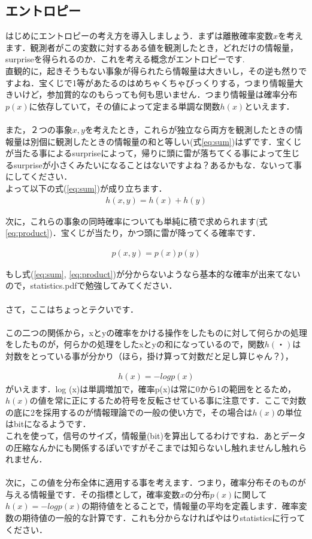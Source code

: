 \documentclass[11pt,a4paper]{jsarticle}                    %
\begin{document}
\subsection{エントロピー}
はじめにエントロピーの考え方を導入しましょう．まずは離散確率変数$x$を考えます．観測者がこの変数に対するある値を観測したとき，どれだけの情報量，surpriseを得られるのか．これを考える概念がエントロピーです.\\
直観的に，起きそうもない事象が得られたら情報量は大きいし，その逆も然りですよね．宝くじで1等があたるのはめちゃくちゃびっくりする，つまり情報量大きいけど，参加賞的なのもらっても何も思いません．つまり情報量は確率分布$p(x)$に依存していて，その値によって定まる単調な関数$h(x)$といえます．\\
\\
また，２つの事象$x, y$を考えたとき，これらが独立なら両方を観測したときの情報量は別個に観測したときの情報量の和と等しい(式\ref{eq:sum})はずです．宝くじが当たる事によるsurpriseによって，帰りに頭に雷が落ちてくる事によって生じるsurpriseが小さくみたいになることはないですよね？あるかもな．ないって事にしてください．\\
よって以下の式(\ref{eq:sum})が成り立ちます．
\begin{eqnarray}
\label{eq:sum}
h(x,y) = h(x) + h(y)
\end{eqnarray}

次に，これらの事象の同時確率についても単純に積で求められます(式\ref{eq:product})．宝くじが当たり，かつ頭に雷が降ってくる確率です．

\begin{eqnarray}
\label{eq:product}
p(x,y) = p(x)p(y)
\end{eqnarray}

もし式(\ref{eq:sum}, \ref{eq:product})が分からないようなら基本的な確率が出来てないので，statistics.pdfで勉強してみてください．\\
\\
さて，ここはちょっとテクいです．\\
\\
この二つの関係から，xとyの確率をかける操作をしたものに対して何らかの処理をしたものが，何らかの処理をしたxとyの和になっているので，関数$h(・)$は対数をとっている事が分かり（ほら，掛け算って対数だと足し算じゃん？），

\begin{eqnarray}
h(x) = -log p(x)
\end{eqnarray}
がいえます．log (x)は単調増加で，確率p(x)は常に0から1の範囲をとるため，$h(x)$の値を常に正にするため符号を反転させている事に注意です．ここで対数の底に2を採用するのが情報理論での一般の使い方で，その場合は$h(x)$の単位はbitになるようです．\\
これを使って，信号のサイズ，情報量(bit)を算出してるわけですね．あとデータの圧縮なんかにも関係するぽいですがそこまでは知らないし触れませんし触れられません．\\
\\
次に，この値を分布全体に適用する事を考えます．つまり，確率分布そのものが与える情報量です．その指標として，確率変数$x$の分布$p(x)$に関して$h(x)=-log p(x)$の期待値をとることで，情報量の平均を定義します．確率変数の期待値の一般的な計算です．これも分からなければやはりstatisticsに行ってください．\\
\end{document}
